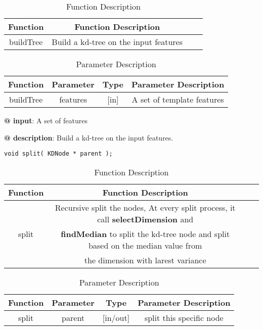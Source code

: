 \documentclass[paper=a4, fontsize=11pt]{scrartcl} %
\numberwithin{equation}{section} %
\numberwithin{figure}{section} %
\numberwithin{table}{section} %
\begin{document}
\begin{table}[h]
    \centering
    \begin{tabular}{|c|c| lp{}}
        \hline
        \textbf{Function} & \textbf{Function Description} \\\hline
    buildTree & Build a kd-tree on the input features \\\hline
    \end{tabular}
    \caption{Function Description}\label{nolock}
\end{table}

\begin{table}[h]
    \centering
    \begin{tabular}{|c|c|c|c|}
        \hline
        \textbf{Function} & \textbf{Parameter} & \textbf{Type} & \textbf{Parameter Description} \\\hline
            buildTree & features & [in] &A set of template features\\\hline
    \end{tabular}
    \caption{Parameter Description}\label{nolock}
\end{table}
\textbf{@ input}: A set of features

\textbf{@ description}: Build a kd-tree on the input features.\\

\begin{lstlisting}
void split( KDNode * parent );
\end{lstlisting}

\begin{table}[h]
    \centering
    \begin{tabular}{|c|c| lp{}}
        \hline
        \textbf{Function} & \textbf{Function Description} \\\hline
   \multirow{3}{*}{split} & Recursive split the nodes, At every split process, it call \textbf{selectDimension} and \\& \textbf{findMedian} to split the kd-tree node and split based on the median value from \\& the dimension with larest variance\\\hline
    \end{tabular}
    \caption{Function Description}\label{nolock}
\end{table}

\begin{table}[h]
    \centering
    \begin{tabular}{|c|c|c|c|}
        \hline
        \textbf{Function} & \textbf{Parameter} & \textbf{Type} & \textbf{Parameter Description} \\\hline
            split & parent & [in/out] & split this specific node \\\hline
    \end{tabular}
    \caption{Parameter Description}\label{nolock}
\end{table}
\end{document}
